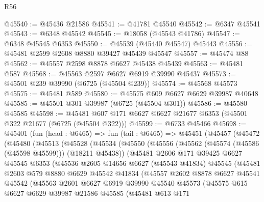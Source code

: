 \begin{lexlean}{R56}
\begin{coremodule}
@45540 := @45436 @21586
@45541 := @41781 @45540
@45542 := @6347 @45541
@45543 := @6348 @45542
@45545 := @18058 (@45543 @41786)
@45547 := @6348 @45545 @6353
@45550 := @45539 (@45440 @45547) @45443
@45556 := @45481 @2599 @2608 @8880 @39427 @45439 @45547
@45557 := @45474 @88
@45562 := @45557 @2598 @8878 @6627 @45438 @45439
@45563 := @45481 @587
@45568 := @45563 @2597 @6627 @6919 @39990 @45437
@45573 := @45501 @239 @39990 (@6725 (@45504 @239))
@45574 := @45568 @45573
@45575 := @45481 @589
@45580 := @45575 @609 @6627 @6629 @39987 @40648
@45585 := @45501 @301 @39987 (@6725 (@45504 @301))
@45586 := @45580 @45585
@45598 := @45481 @607 @171 @6627 @6627 @21677 @6353 (@45501 @322 @21677 (@6725 (@45504 @322)))
@45599 := @6733 @45466
@45698 := @45401
    (fun (head : @6465) =>
    fun (tail : @6465) =>
    @45451
      (@45457
        (@45472
          (@45480
            (@45513
              (@45528
                (@45534
                  (@45550
                    (@45556
                      (@45562 (@45574 (@45586 (@45598 @45599))) (@18211 @45438))
                      (@45481
                        @2606
                        @171
                        @39425
                        @6627
                        @45545
                        @6353
                        (@45536
                          @2605
                          @14656
                          @6627
                          (@45543 @41834)
                          @45545
                          (@45481
                            @2603
                            @579
                            @8880
                            @6629
                            @45542
                            @41834
                            (@45557
                              @2602
                              @8878
                              @6627
                              @45541
                              @45542
                              (@45563
                                @2601
                                @6627
                                @6919
                                @39990
                                @45540
                                @45573
                                (@45575
                                  @615
                                  @6627
                                  @6629
                                  @39987
                                  @21586
                                  @45585
                                  (@45481
                                    @613
                                    @171

\end{coremodule}
\end{lexlean}
